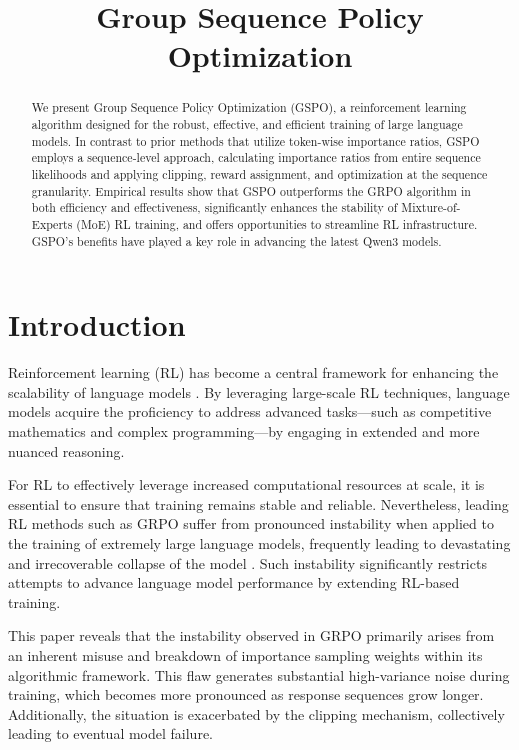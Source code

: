 \title{Group Sequence Policy Optimization}

\begin{abstract}
We present Group Sequence Policy Optimization (GSPO), a reinforcement learning algorithm designed for the robust, effective, and efficient training of large language models. In contrast to prior methods that utilize token-wise importance ratios, GSPO employs a sequence-level approach, calculating importance ratios from entire sequence likelihoods and applying clipping, reward assignment, and optimization at the sequence granularity. Empirical results show that GSPO outperforms the GRPO algorithm in both efficiency and effectiveness, significantly enhances the stability of Mixture-of-Experts (MoE) RL training, and offers opportunities to streamline RL infrastructure. GSPO's benefits have played a key role in advancing the latest Qwen3 models.
\end{abstract}

\section{Introduction}
\label{sec:intro}

Reinforcement learning (RL) has become a central framework for enhancing the scalability of language models \citep{o1,dpsk-r1,qwq32b,qwen3}. By leveraging large-scale RL techniques, language models acquire the proficiency to address advanced tasks—such as competitive mathematics and complex programming—by engaging in extended and more nuanced reasoning.

For RL to effectively leverage increased computational resources at scale, it is essential to ensure that training remains stable and reliable. Nevertheless, leading RL methods such as GRPO \citep{grpo} suffer from pronounced instability when applied to the training of extremely large language models, frequently leading to devastating and irrecoverable collapse of the model \citep{qwen3, minimax-m1}. Such instability significantly restricts attempts to advance language model performance by extending RL-based training.

This paper reveals that the instability observed in GRPO primarily arises from an inherent misuse and breakdown of importance sampling weights within its algorithmic framework. This flaw generates substantial high-variance noise during training, which becomes more pronounced as response sequences grow longer. Additionally, the situation is exacerbated by the clipping mechanism, collectively leading to eventual model failure.

